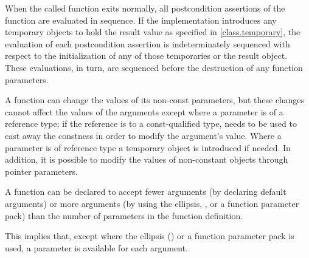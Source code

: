 \pnum
When the called function exits normally,
all postcondition assertions of the function
are evaluated in sequence.
If the implementation introduces any temporary objects
to hold the result value as specified in \ref{class.temporary},
the evaluation of each postcondition assertion
is indeterminately sequenced with respect to
the initialization of any of those temporaries or the result object.
These evaluations, in turn, are sequenced before
the destruction of any function parameters.

\pnum
\begin{note}
%
%
%
%
%
%
A function can change the values of its non-const parameters, but these
changes cannot affect the values of the arguments except where a
parameter is of a reference type; if the reference is to
a const-qualified type,  needs to be used to
cast away the constness in order to modify the argument's value. Where a
parameter is of  reference type a temporary object is
introduced if
needed.
In addition, it is possible to modify the values of non-constant objects through
pointer parameters.
\end{note}

\pnum
{}%
%
A function can be declared to accept fewer arguments (by declaring default
arguments) or more arguments (by using the ellipsis,
, or a function parameter pack) than the number of
parameters in the function definition.
\begin{note}
This implies that, except where the ellipsis () or a function
parameter pack is used, a parameter is available for each argument.
\end{note}

